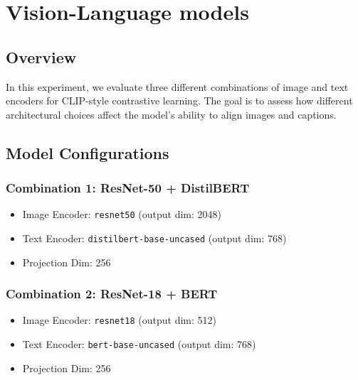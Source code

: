 \documentclass[11pt]{article}
\begin{document}


\pagebreak

\section{Vision-Language models}

\subsection*{Overview}
In this experiment, we evaluate three different combinations of image and text encoders for CLIP-style contrastive learning. The goal is to assess how different architectural choices affect the model’s ability to align images and captions.

\subsection*{Model Configurations}
\subsubsection*{Combination 1: ResNet-50 + DistilBERT}
\begin{itemize}
    \item Image Encoder: \texttt{resnet50} (output dim: 2048)
    \item Text Encoder: \texttt{distilbert-base-uncased} (output dim: 768)
    \item Projection Dim: 256
\end{itemize}

\subsubsection*{Combination 2: ResNet-18 + BERT}
\begin{itemize}
    \item Image Encoder: \texttt{resnet18} (output dim: 512)
    \item Text Encoder: \texttt{bert-base-uncased} (output dim: 768)
    \item Projection Dim: 256
\end{itemize}
\end{document}

